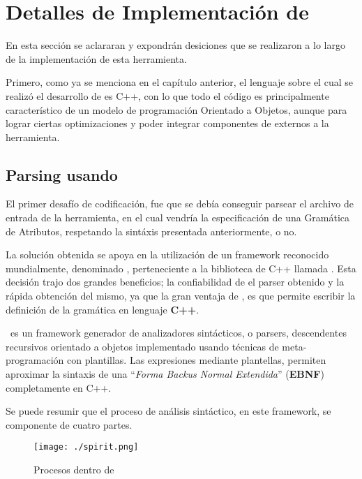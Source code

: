 \chapter{Detalles de Implementaci\'on de \maggen}
\label{chap:implem}
\minitoc

En esta sección se aclararan y expondrán desiciones que se realizaron a lo largo de la implementación de esta herramienta.

Primero, como ya se menciona en el capítulo anterior, el lenguaje sobre el cual se realizó el desarrollo de \maggen es C++, con lo que todo el código es principalmente característico de un modelo de programación Orientado a Objetos, aunque para lograr ciertas optimizaciones y poder integrar componentes de externos a la herramienta.

\section{Parsing usando \boost \ \spirit}

El primer desafío de codificación, fue que se debía conseguir parsear el archivo de entrada de la herramienta, en el cual vendría la especificación de una Gramática de Atributos, respetando la sintáxis presentada anteriormente, o no.

La solución obtenida se apoya en la utilización de un framework reconocido mundialmente, denominado \spirit, perteneciente a la biblioteca de C++ llamada \boost. Esta decisión trajo dos grandes beneficios; la confiabilidad de el parser obtenido y la rápida obtención del mismo, ya que la gran ventaja de \spirit, es que permite escribir la definición de la gramática en lenguaje \textbf{C++}.

\spirit\ es un framework generador de analizadores sintácticos, o parsers, descendentes recursivos orientado a objetos implementado usando técnicas de meta-programación con plantillas. Las expresiones mediante plantellas, permiten aproximar la sintaxis de una ``\textit{\textit{Forma Backus Normal Extendida}}'' (\textbf{EBNF}) completamente en C++.

Se puede resumir que el proceso de análisis sintáctico, en este framework, se componente de cuatro partes.

\begin{figure}\begin{center}
\texttt{[image: ./spirit.png]}
\caption{\label{procesoSpirit} Procesos dentro de \spirit}               
\end{center}\end{figure}

